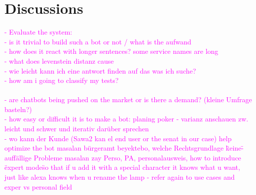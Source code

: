 \section{Discussions}
\label{discussions}

\textcolor{magenta}{
- Evaluate the system:\\
- is it trivial to build such a bot or not / what is the aufwand\\
- how does it react with longer sentences? some service names are long\\
- what does levenstein distanz cause\\
- wie leicht kann ich eine antwort finden auf das was ich suche?\\
- how am i going to classify my tests?\\
\\
- are chatbots being pushed on the market or is there a demand? (kleine Umfrage basteln?)\\
- how easy or difficult it is to make a bot: planing poker - varianz anschauen zw. leicht und schwer und iterativ darüber sprechen\\
-	wo kann der Kunde (Sawa2 kan el end user or the senat in our case) help optimize the bot
masalan bürgeramt beyektebo, welche Rechtsgrundlage \"keine\"
-	auff\"{a}llige Probleme
masalan zay Perso, PA, personalausweis, how to introduce \"expert mode\" so that if u add it with a special character it knows what u want, just like alexa knows when u rename the lamp - refer again to use cases and exper vs personal field
}